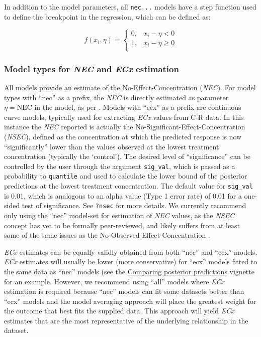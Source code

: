 \documentclass[
]{jss}
\begin{document}
In addition to the model parameters, all \texttt{nec...} models have a
step function used to define the breakpoint in the regression, which can
be defined as:

\[
f(x_i, \eta) = \begin{cases} 
      0, & x_i - \eta < 0 \\
      1, & x_i - \eta \geq 0 \\
   \end{cases}
\]

\hypertarget{model-types-for-nec-and-ecx-estimation}{%
\subsubsection{\texorpdfstring{Model types for \emph{NEC} and \emph{ECx}
estimation}{Model types for NEC and ECx estimation}}\label{model-types-for-nec-and-ecx-estimation}}

All models provide an estimate of the No-Effect-Concentration
(\emph{NEC}). For model types with ``nec'' as a prefix, the \emph{NEC}
is directly estimated as parameter \(\eta = \text{NEC}\) in the model,
as per \citet{Fox2010}. Models with ``ecx'' as a prefix are continuous
curve models, typically used for extracting \emph{ECx} values from C-R
data. In this instance the \emph{NEC} reported is actually the
No-Significant-Effect-Concentration (\emph{NSEC}), defined as the
concentration at which the predicted response is now ``significantly''
lower than the values observed at the lowest treatment concentration
(typically the `control'). The desired level of ``significance'' can be
controlled by the user through the argument \texttt{sig\_val}, which is
passed as a probability to \texttt{quantile} and used to calculate the
lower bound of the posterior predictions at the lowest treatment
concentration. The default value for \texttt{sig\_val} is 0.01, which is
analogous to an alpha value (Type 1 error rate) of 0.01 for a one-sided
test of significance. See \texttt{?nsec} for more details. We currently
recommend only using the ``nec'' model-set for estimation of \emph{NEC}
values, as the \emph{NSEC} concept has yet to be formally peer-reviewed,
and likely suffers from at least some of the same issues as the
No-Observed-Effect-Concentration \citep{Warne2008a, Fox2008}.

\emph{ECx} estimates can be equally validly obtained from both ``nec''
and ``ecx'' models. \emph{ECx} estimates will usually be lower (more
conservative) for ``ecx'' models fitted to the same data as ``nec''
models (see the
\href{https://open-aims.github.io/bayesnec/articles/example4.html}{Comparing
posterior predictions} vignette for an example. However, we recommend
using ``all'' models where \emph{ECx} estimation is required because
``nec'' models can fit some datasets better than ``ecx'' models and the
model averaging approach will place the greatest weight for the outcome
that best fits the supplied data. This approach will yield \emph{ECx}
estimates that are the most representative of the underlying
relationship in the dataset.
\end{document}

